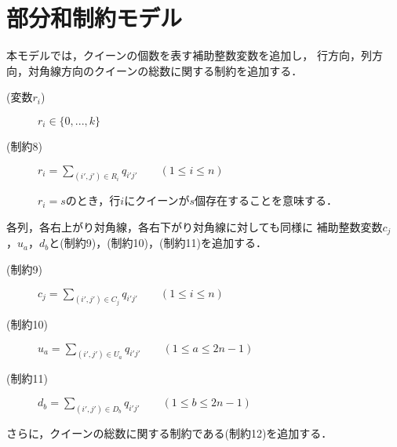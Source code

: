 \newpage
\section{部分和制約モデル}
本モデルでは，クイーンの個数を表す補助整数変数を追加し，
行方向，列方向，対角線方向のクイーンの総数に関する制約を追加する．
\begin{description}
 \item[(変数$r_i$)] $r_{i} \in \{0,...,k\}$ 
 \item[(制約8)] $r_{i} = \sum\limits _{(i',j') \in R_{i}} q_{i'j'} \qquad (1 \leq i \leq n)$ \par
$r_i = s$のとき，行$i$にクイーンが$s$個存在することを意味する．
\end{description}
%
各列，各右上がり対角線，各右下がり対角線に対しても同様に
補助整数変数$c_j$，$u_{a}$，$d_{b}$と(制約9)，(制約10)，(制約11)を追加する．
%
\begin{description}
 \item[(制約9)] $c_{j} = \sum\limits _{(i',j') \in C_{j}} 
q_{i'j'} \qquad (1 \leq i \leq n)$
 \item[(制約10)] $u_{a} = \sum\limits _{(i',j') \in U_{a}} 
q_{i'j'}\qquad (1 \leq a \leq 2n-1)$
 \item[(制約11)] $d_{b} = \sum\limits _{(i',j') \in D_{b}} 
q_{i'j'} \qquad(1 \leq b \leq 2n-1)$
\end{description}
さらに，クイーンの総数に関する制約である(制約12)を追加する．
